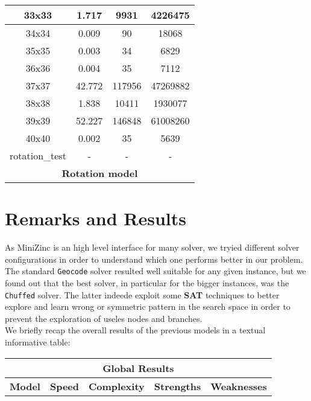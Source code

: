 \begin{center}
\begin{tabular}{|c|c|c|c|}
        33x33 & 1.717 & 9931 & 4226475 \\ \hline
        34x34 & 0.009 & 90 & 18068 \\ \hline
        35x35 & 0.003 & 34 & 6829 \\ \hline
        36x36 & 0.004 & 35 & 7112 \\ \hline
        37x37 & 42.772 & 117956 & 47269882 \\ \hline
        38x38 & 1.838 & 10411 & 1930077 \\ \hline
        39x39 & 52.227 & 146848 & 61008260 \\ \hline
        40x40 & 0.002 & 35 & 5639 \\ \hline
        rotation\_test & - & - & - \\ \hline
        \multicolumn{4}{|c|}{\textbf{Rotation model}} \\
    \end{tabular}
\end{center}

\section{Remarks and Results}
As MiniZinc is an high level interface for many solver, we tryied different solver configurations in order to understand which one performs better
in our problem. The standard \texttt{Geocode} solver resulted well suitable for any given instance, but we found out that the best solver, in particular
for the bigger instances, was the \texttt{Chuffed} solver. The latter indeede exploit some \textbf{SAT} techniques to better explore and learn wrong or symmetric
pattern in the search space in order to prevent the exploration of useles nodes and branches.\\

We briefly recap the overall results of the previous models in a textual informative table:

\begin{center}
    \begin{adjustwidth}{-1.5cm}{}
        \begin{tabular}{|c|c|c|c|c|}
            \hline
            \multicolumn{5}{|c|}{\textbf{Global Results}} \\
            \hline
            \textbf{Model} & \textbf{Speed} & \textbf{Complexity} & \textbf{Strengths} & \textbf{Weaknesses} \\
            \hline
        \end{tabular}
    \end{adjustwidth}
\end{center}